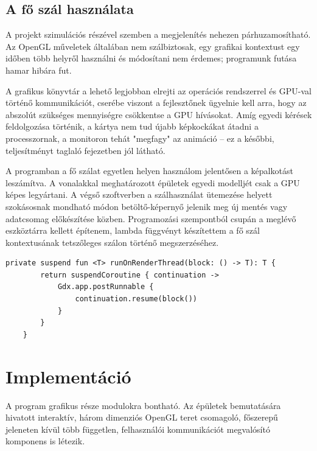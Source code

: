 \subsection{A fő szál használata}

A projekt szimulációs részével szemben a megjelenítés nehezen párhuzamosítható. Az OpenGL műveletek általában nem szálbiztosak, egy grafikai kontextust egy időben több helyről használni és módosítani nem érdemes; programunk futása hamar hibára fut.

A grafikus könyvtár a lehető legjobban elrejti az operációs rendszerrel és GPU-val történő kommunikációt, cserébe viszont a fejlesztőnek ügyelnie kell arra, hogy az abszolút szükséges mennyiségre csökkentse a GPU hívásokat. Amíg egyedi kérések feldolgozása történik, a kártya nem tud újabb képkockákat átadni a processzornak, a monitoron tehát "megfagy" az animáció -- ez a későbbi, teljesítményt taglaló fejezetben jól látható.

A programban a fő szálat egyetlen helyen használom jelentősen a képalkotást leszámítva. A vonalakkal meghatározott épületek egyedi modelljét csak a GPU képes legyártani. A végső szoftverben a szálhasználat ütemezése helyett szokásosnak mondható módon betöltő-képernyő jelenik meg új mentés vagy adatcsomag előkészítése közben. Programozási szempontból csupán a meglévő eszköztárra kellett építenem, lambda függvényt készítettem a fő szál kontextusának tetszőleges szálon történő megszerzéséhez.

\begin{lstlisting}[caption=A kirajzoló szál használatát segítő generikus függvény]
private suspend fun <T> runOnRenderThread(block: () -> T): T {
        return suspendCoroutine { continuation ->
            Gdx.app.postRunnable {
                continuation.resume(block())
            }
        }
    }
\end{lstlisting}

\section{Implementáció}
A program grafikus része modulokra bontható. Az épületek bemutatására hivatott interaktív, három dimenziós OpenGL teret csomagoló, főszerepű jeleneten kívül több független, felhasználói kommunikációt megvalósító komponens is létezik.

